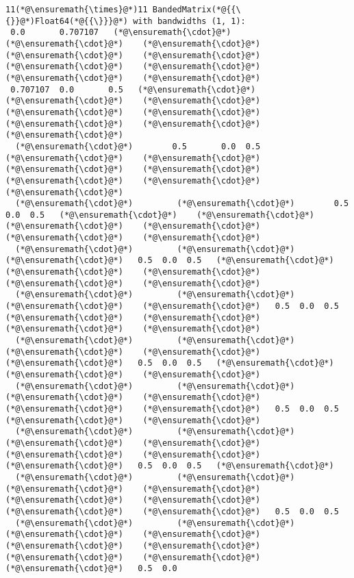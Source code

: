 \documentclass[12pt,a4paper]{article}
\begin{document}
\begin{lstlisting}
11(*@\ensuremath{\times}@*)11 BandedMatrix(*@{{\{}}@*)Float64(*@{{\}}}@*) with bandwidths (1, 1):
 0.0       0.707107   (*@\ensuremath{\cdot}@*)    (*@\ensuremath{\cdot}@*)    (*@\ensuremath{\cdot}@*)    (*@\ensuremath{\cdot}@*)    (*@\ensuremath{\cdot}@*)    (*@\ensuremath{\cdot}@*)    (*@\ensuremath{\cdot}@*)    (*@\ensuremath{\cdot}@*)    (*@\ensuremath{\cdot}@*) 
 0.707107  0.0       0.5   (*@\ensuremath{\cdot}@*)    (*@\ensuremath{\cdot}@*)    (*@\ensuremath{\cdot}@*)    (*@\ensuremath{\cdot}@*)    (*@\ensuremath{\cdot}@*)    (*@\ensuremath{\cdot}@*)    (*@\ensuremath{\cdot}@*)    (*@\ensuremath{\cdot}@*) 
  (*@\ensuremath{\cdot}@*)        0.5       0.0  0.5   (*@\ensuremath{\cdot}@*)    (*@\ensuremath{\cdot}@*)    (*@\ensuremath{\cdot}@*)    (*@\ensuremath{\cdot}@*)    (*@\ensuremath{\cdot}@*)    (*@\ensuremath{\cdot}@*)    (*@\ensuremath{\cdot}@*) 
  (*@\ensuremath{\cdot}@*)         (*@\ensuremath{\cdot}@*)        0.5  0.0  0.5   (*@\ensuremath{\cdot}@*)    (*@\ensuremath{\cdot}@*)    (*@\ensuremath{\cdot}@*)    (*@\ensuremath{\cdot}@*)    (*@\ensuremath{\cdot}@*)    (*@\ensuremath{\cdot}@*) 
  (*@\ensuremath{\cdot}@*)         (*@\ensuremath{\cdot}@*)         (*@\ensuremath{\cdot}@*)   0.5  0.0  0.5   (*@\ensuremath{\cdot}@*)    (*@\ensuremath{\cdot}@*)    (*@\ensuremath{\cdot}@*)    (*@\ensuremath{\cdot}@*)    (*@\ensuremath{\cdot}@*) 
  (*@\ensuremath{\cdot}@*)         (*@\ensuremath{\cdot}@*)         (*@\ensuremath{\cdot}@*)    (*@\ensuremath{\cdot}@*)   0.5  0.0  0.5   (*@\ensuremath{\cdot}@*)    (*@\ensuremath{\cdot}@*)    (*@\ensuremath{\cdot}@*)    (*@\ensuremath{\cdot}@*) 
  (*@\ensuremath{\cdot}@*)         (*@\ensuremath{\cdot}@*)         (*@\ensuremath{\cdot}@*)    (*@\ensuremath{\cdot}@*)    (*@\ensuremath{\cdot}@*)   0.5  0.0  0.5   (*@\ensuremath{\cdot}@*)    (*@\ensuremath{\cdot}@*)    (*@\ensuremath{\cdot}@*) 
  (*@\ensuremath{\cdot}@*)         (*@\ensuremath{\cdot}@*)         (*@\ensuremath{\cdot}@*)    (*@\ensuremath{\cdot}@*)    (*@\ensuremath{\cdot}@*)    (*@\ensuremath{\cdot}@*)   0.5  0.0  0.5   (*@\ensuremath{\cdot}@*)    (*@\ensuremath{\cdot}@*) 
  (*@\ensuremath{\cdot}@*)         (*@\ensuremath{\cdot}@*)         (*@\ensuremath{\cdot}@*)    (*@\ensuremath{\cdot}@*)    (*@\ensuremath{\cdot}@*)    (*@\ensuremath{\cdot}@*)    (*@\ensuremath{\cdot}@*)   0.5  0.0  0.5   (*@\ensuremath{\cdot}@*) 
  (*@\ensuremath{\cdot}@*)         (*@\ensuremath{\cdot}@*)         (*@\ensuremath{\cdot}@*)    (*@\ensuremath{\cdot}@*)    (*@\ensuremath{\cdot}@*)    (*@\ensuremath{\cdot}@*)    (*@\ensuremath{\cdot}@*)    (*@\ensuremath{\cdot}@*)   0.5  0.0  0.5
  (*@\ensuremath{\cdot}@*)         (*@\ensuremath{\cdot}@*)         (*@\ensuremath{\cdot}@*)    (*@\ensuremath{\cdot}@*)    (*@\ensuremath{\cdot}@*)    (*@\ensuremath{\cdot}@*)    (*@\ensuremath{\cdot}@*)    (*@\ensuremath{\cdot}@*)    (*@\ensuremath{\cdot}@*)   0.5  0.0
\end{lstlisting}
\end{document}
